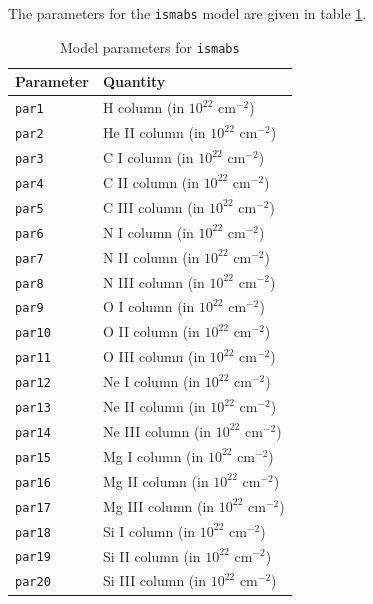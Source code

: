 			The parameters for the \texttt{ismabs} model are given in table \ref{param:ismabs}.
			\begin{table}[h!]
				\centering
				\caption{Model parameters for \texttt{ismabs}}
				\label{param:ismabs}
				\begin{tabular}{|p{3cm}|p{10cm}|}
					\hline
					\textbf{Parameter} & \textbf{Quantity} \\ \hline
					{\texttt{par1}} & {H column (in $10^{22}$ cm$^{-2}$)} \\ \hline
					{\texttt{par2}} & {He II column (in $10^{22}$ cm$^{-2}$)} \\ \hline
					{\texttt{par3}} & {C I column (in $10^{22}$ cm$^{-2}$)} \\ \hline
					{\texttt{par4}} & {C II column (in $10^{22}$ cm$^{-2}$)} \\ \hline
					{\texttt{par5}} & {C III column (in $10^{22}$ cm$^{-2}$)} \\ \hline
					{\texttt{par6}} & {N I column (in $10^{22}$ cm$^{-2}$)} \\ \hline
					{\texttt{par7}} & {N II column (in $10^{22}$ cm$^{-2}$)} \\ \hline
					{\texttt{par8}} & {N III column (in $10^{22}$ cm$^{-2}$)} \\ \hline
					{\texttt{par9}} & {O I column (in $10^{22}$ cm$^{-2}$)} \\ \hline
					{\texttt{par10}} & {O II column (in $10^{22}$ cm$^{-2}$)} \\ \hline
					{\texttt{par11}} & {O III column (in $10^{22}$ cm$^{-2}$)} \\ \hline
					{\texttt{par12}} & {Ne I column (in $10^{22}$ cm$^{-2}$)} \\ \hline
					{\texttt{par13}} & {Ne II column (in $10^{22}$ cm$^{-2}$)} \\ \hline
					{\texttt{par14}} & {Ne III column (in $10^{22}$ cm$^{-2}$)} \\ \hline
					{\texttt{par15}} & {Mg I column (in $10^{22}$ cm$^{-2}$)} \\ \hline
					{\texttt{par16}} & {Mg II column (in $10^{22}$ cm$^{-2}$)} \\ \hline
					{\texttt{par17}} & {Mg III column (in $10^{22}$ cm$^{-2}$)} \\ \hline
					{\texttt{par18}} & {Si I column (in $10^{22}$ cm$^{-2}$)} \\ \hline
					{\texttt{par19}} & {Si II column (in $10^{22}$ cm$^{-2}$)} \\ \hline
					{\texttt{par20}} & {Si III column (in $10^{22}$ cm$^{-2}$)} \\ \hline

\end{tabular}
\end{table}
